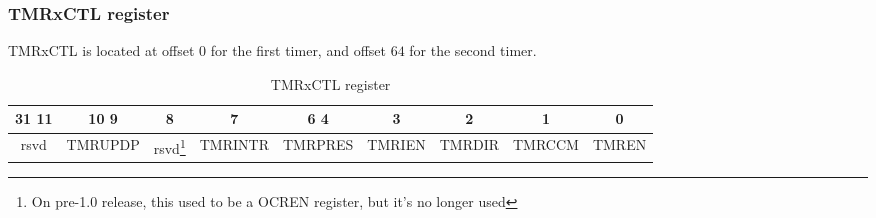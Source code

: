 \subsubsection{TMRxCTL register}

TMRxCTL is located at offset $0$ for the first timer, and offset $64$ for the second timer.

\begin{table}[H]
\begin{center}
\begin{tabularx}{14cm}{Xcccccccc}
31 \hfill 11 & 10 \hfill 9 & 8 & 7 & 6  \hfill 4 & 3 & 2 & 1 & 0  \\
\hline
\multicolumn{1}{|c|}{\tiny rsvd} & 
\multicolumn{1}{|c|}{\tiny TMRUPDP} &
\multicolumn{1}{|c|}{\tiny rsvd\footnote{On pre-1.0 release, this used to be a OCREN register, but it's no longer used}} &
\multicolumn{1}{|c|}{\tiny TMRINTR} &
\multicolumn{1}{|c|}{\tiny TMRPRES} &
\multicolumn{1}{|c|}{\tiny TMRIEN} &
\multicolumn{1}{|c|}{\tiny TMRDIR} &
\multicolumn{1}{|c|}{\tiny TMRCCM} &
\multicolumn{1}{|c|}{\tiny TMREN}  \\
\hline
\end{tabularx}
\caption{TMRxCTL register}
\end{center}
\end{table}


